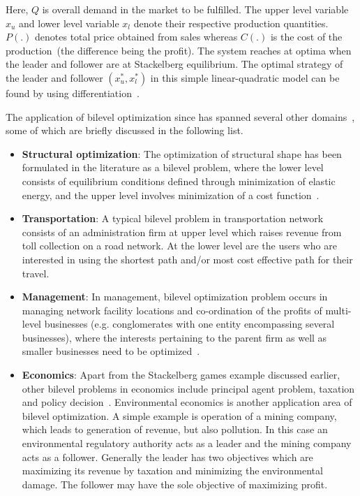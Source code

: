 	

	
Here, $Q$ is overall demand in the market to be fulfilled. The upper level variable $x_u$ and lower level variable $x_l$ denote their respective production quantities. $P(.)$ denotes total price obtained from sales whereas $C(.)$ is the cost of the production~(the difference being the profit). The system reaches at optima when the leader and follower are at Stackelberg equilibrium. The optimal strategy of the leader and follower $(x_u^*, x_l^*)$ in this simple linear-quadratic model can be found by using differentiation~\cite{sinha2013multi}. 

The application of bilevel optimization since has spanned several other domains~\cite{sinha2017review}, some of which are briefly discussed in the following list.
                        
\begin{itemize}
\def\labelitemi{$\bullet$}

\item{} \textbf{Structural optimization}: The optimization of  structural shape has been formulated in the literature as a bilevel problem, where the lower level consists of equilibrium conditions defined through minimization of elastic energy, and the upper level involves minimization of a cost function~\cite{herskovits2000contact,christiansen2001stochastic}. 

\item{} \textbf{Transportation}: A typical bilevel problem in transportation network~\cite{wang2014transportation,sinha2015transportation,brotcorne2001bilevel,migdalas1995bilevel} consists of an administration firm at upper level which raises revenue from toll collection on a road network. At the lower level are the users who are interested in using the shortest path and/or most cost effective path for their travel. 

\item{}\textbf{Management}: In management, bilevel optimization problem occurs in managing network facility locations and co-ordination of the profits of multi-level businesses (e.g. conglomerates with one entity encompassing several businesses), where the interests pertaining to the parent firm as well as smaller businesses need to be optimized~\cite{sinha2013efficient,cassidy1971efficient}.

\item{}\textbf{Economics}: Apart from the Stackelberg games example discussed earlier, other bilevel problems in economics include principal agent problem, taxation and policy decision~\cite{sinha2013multi}. Environmental economics is another application area of bilevel optimization. A simple example is operation of a mining company, which leads to generation of revenue,  but also pollution. In this case an environmental regulatory authority acts as a leader and the mining company acts as a follower. Generally the leader has two objectives which are maximizing its revenue by taxation and minimizing the environmental damage. The follower may have the sole objective of maximizing profit.


\end{itemize}
